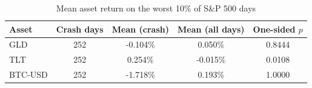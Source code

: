 \begin{table}[H]
\centering
\caption{Mean asset return on the worst 10\% of S\&P 500 days}
\begin{tabular}{lcccc}
\toprule
Asset & Crash days & Mean (crash) & Mean (all days) & One-sided $p$ \\
\midrule
GLD & 252 & -0.104\% & 0.050\% & 0.8444 \\
TLT & 252 & 0.254\% & -0.015\% & 0.0108 \\
BTC-USD & 252 & -1.718\% & 0.193\% & 1.0000 \\
\bottomrule
\end{tabular}
\end{table}
